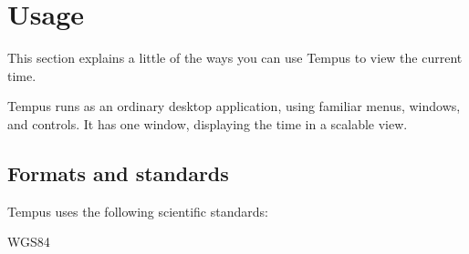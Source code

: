 \section{Usage}

This section explains a little of the ways you can use Tempus to view the current time.

Tempus runs as an ordinary desktop application, using familiar menus, windows, and controls. It has one window, displaying the time in a scalable view.

\subsection{Formats and standards}

Tempus uses the following scientific standards:

WGS84
